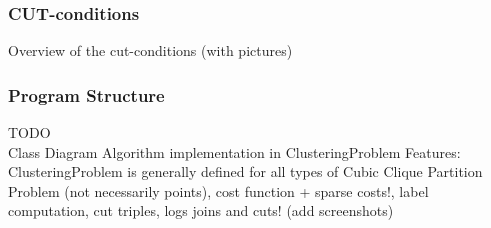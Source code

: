 \begin{frame}
    \frametitle{CUT-conditions}
    Overview of the cut-conditions (with pictures)
\end{frame}

\begin{frame}
    \frametitle{Program Structure}
    TODO\\
    Class Diagram
    Algorithm implementation in ClusteringProblem
    Features: ClusteringProblem is generally defined for all types of Cubic Clique Partition Problem (not necessarily points),
        cost function + sparse costs!, label computation, cut triples,
        logs joins and cuts! (add screenshots)
\end{frame}




